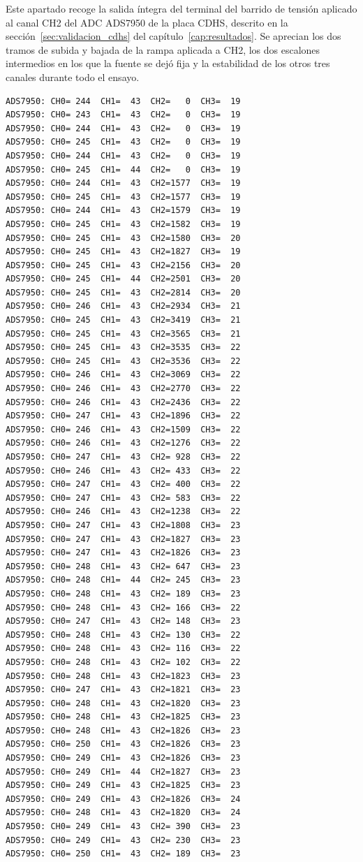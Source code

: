 Este apartado recoge la salida íntegra del terminal del barrido de tensión aplicado al canal
CH2 del ADC ADS7950 de la placa CDHS, descrito en la sección~\ref{sec:validacion_cdhs} del
capítulo~\ref{cap:resultados}. Se aprecian los dos tramos de subida y bajada de la rampa
aplicada a CH2, los dos escalones intermedios en los que la fuente se dejó fija y la
estabilidad de los otros tres canales durante todo el ensayo.

\begin{lstlisting}[style=terminal, caption={Salida completa del terminal --- barrido de tensión sobre CH2 del ADS7950 (placa CDHS)}]
ADS7950: CH0= 244  CH1=  43  CH2=   0  CH3=  19
ADS7950: CH0= 243  CH1=  43  CH2=   0  CH3=  19
ADS7950: CH0= 244  CH1=  43  CH2=   0  CH3=  19
ADS7950: CH0= 245  CH1=  43  CH2=   0  CH3=  19
ADS7950: CH0= 244  CH1=  43  CH2=   0  CH3=  19
ADS7950: CH0= 245  CH1=  44  CH2=   0  CH3=  19
ADS7950: CH0= 244  CH1=  43  CH2=1577  CH3=  19
ADS7950: CH0= 245  CH1=  43  CH2=1577  CH3=  19
ADS7950: CH0= 244  CH1=  43  CH2=1579  CH3=  19
ADS7950: CH0= 245  CH1=  43  CH2=1582  CH3=  19
ADS7950: CH0= 245  CH1=  43  CH2=1580  CH3=  20
ADS7950: CH0= 245  CH1=  43  CH2=1827  CH3=  19
ADS7950: CH0= 245  CH1=  43  CH2=2156  CH3=  20
ADS7950: CH0= 245  CH1=  44  CH2=2501  CH3=  20
ADS7950: CH0= 245  CH1=  43  CH2=2814  CH3=  20
ADS7950: CH0= 246  CH1=  43  CH2=2934  CH3=  21
ADS7950: CH0= 245  CH1=  43  CH2=3419  CH3=  21
ADS7950: CH0= 245  CH1=  43  CH2=3565  CH3=  21
ADS7950: CH0= 245  CH1=  43  CH2=3535  CH3=  22
ADS7950: CH0= 245  CH1=  43  CH2=3536  CH3=  22
ADS7950: CH0= 246  CH1=  43  CH2=3069  CH3=  22
ADS7950: CH0= 246  CH1=  43  CH2=2770  CH3=  22
ADS7950: CH0= 246  CH1=  43  CH2=2436  CH3=  22
ADS7950: CH0= 247  CH1=  43  CH2=1896  CH3=  22
ADS7950: CH0= 246  CH1=  43  CH2=1509  CH3=  22
ADS7950: CH0= 246  CH1=  43  CH2=1276  CH3=  22
ADS7950: CH0= 247  CH1=  43  CH2= 928  CH3=  22
ADS7950: CH0= 246  CH1=  43  CH2= 433  CH3=  22
ADS7950: CH0= 247  CH1=  43  CH2= 400  CH3=  22
ADS7950: CH0= 247  CH1=  43  CH2= 583  CH3=  22
ADS7950: CH0= 246  CH1=  43  CH2=1238  CH3=  22
ADS7950: CH0= 247  CH1=  43  CH2=1808  CH3=  23
ADS7950: CH0= 247  CH1=  43  CH2=1827  CH3=  23
ADS7950: CH0= 247  CH1=  43  CH2=1826  CH3=  23
ADS7950: CH0= 248  CH1=  43  CH2= 647  CH3=  23
ADS7950: CH0= 248  CH1=  44  CH2= 245  CH3=  23
ADS7950: CH0= 248  CH1=  43  CH2= 189  CH3=  23
ADS7950: CH0= 248  CH1=  43  CH2= 166  CH3=  22
ADS7950: CH0= 247  CH1=  43  CH2= 148  CH3=  23
ADS7950: CH0= 248  CH1=  43  CH2= 130  CH3=  22
ADS7950: CH0= 248  CH1=  43  CH2= 116  CH3=  22
ADS7950: CH0= 248  CH1=  43  CH2= 102  CH3=  22
ADS7950: CH0= 248  CH1=  43  CH2=1823  CH3=  23
ADS7950: CH0= 247  CH1=  43  CH2=1821  CH3=  23
ADS7950: CH0= 248  CH1=  43  CH2=1820  CH3=  23
ADS7950: CH0= 248  CH1=  43  CH2=1825  CH3=  23
ADS7950: CH0= 248  CH1=  43  CH2=1826  CH3=  23
ADS7950: CH0= 250  CH1=  43  CH2=1826  CH3=  23
ADS7950: CH0= 249  CH1=  43  CH2=1826  CH3=  23
ADS7950: CH0= 249  CH1=  44  CH2=1827  CH3=  23
ADS7950: CH0= 249  CH1=  43  CH2=1825  CH3=  23
ADS7950: CH0= 249  CH1=  43  CH2=1826  CH3=  24
ADS7950: CH0= 248  CH1=  43  CH2=1820  CH3=  24
ADS7950: CH0= 249  CH1=  43  CH2= 390  CH3=  23
ADS7950: CH0= 249  CH1=  43  CH2= 230  CH3=  23
ADS7950: CH0= 250  CH1=  43  CH2= 189  CH3=  23
\end{lstlisting}
